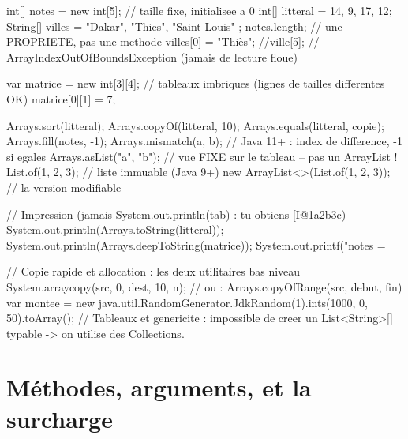 \documentclass[12pt,a4paper,twoside,openright]{book}
\begin{document}
\begin{codejava}
int[] notes = new int[5];                 // taille fixe, initialisee a 0
int[] litteral = {14, 9, 17, 12};
String[] villes = { "Dakar", "Thies", "Saint-Louis" };
notes.length;                              // une PROPRIETE, pas une methode
villes[0] = "Thi\`es";
//ville[5];                                 // ArrayIndexOutOfBoundsException (jamais de lecture floue)

var matrice = new int[3][4];               // tableaux imbriques (lignes de tailles differentes OK)
matrice[0][1] = 7;

Arrays.sort(litteral);
Arrays.copyOf(litteral, 10);
Arrays.equals(litteral, copie);
Arrays.fill(notes, -1);
Arrays.mismatch(a, b);                      // Java 11+ : index de difference, -1 si egales
Arrays.asList("a", "b");                    // vue FIXE sur le tableau -- pas un ArrayList !
List.of(1, 2, 3);                            // liste immuable (Java 9+)
new ArrayList<>(List.of(1, 2, 3));           // la version modifiable

// Impression (jamais System.out.println(tab) : tu obtiens [I@1a2b3c)
System.out.println(Arrays.toString(litteral));
System.out.println(Arrays.deepToString(matrice));
System.out.printf("notes = %

// Copie rapide et allocation : les deux utilitaires bas niveau
System.arraycopy(src, 0, dest, 10, n);     // ou : Arrays.copyOfRange(src, debut, fin)
var montee = new java.util.RandomGenerator.JdkRandom(1).ints(1000, 0, 50).toArray();
// Tableaux et genericite : impossible de creer un List<String>[] typable -> on utilise des Collections.
\end{codejava}

\section{M\'ethodes, arguments, et la surcharge}
\end{document}
